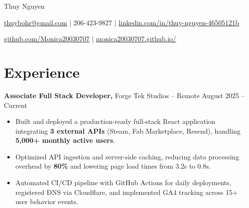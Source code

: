 \documentclass[11pt]{article}       %
\begin{document}
\centerline{\Huge Thuy Nguyen}

\vspace{5pt}

\centerline{\href{mailto:thuybohr@gmail.com}{thuybohr@gmail.com} | 206-423-9827 |
\href{https://www.linkedin.com/in/thuy-nguyen-46505121b/}{linkedin.com/in/thuy-nguyen-46505121b}}

\centerline{\href{https://github.com/Monica20030707}{github.com/Monica20030707} | 
\href{https://monica20030707.github.io/}{monica20030707.github.io/}} 

\vspace{-9pt}

\section*{Experience}

\textbf{Associate Full Stack Developer,} {Forge Tek Studios} -- Remote \hfill August 2025 -- Current \\
\vspace{-9pt}
\begin{itemize}
  \item Built and deployed a production-ready full-stack React application integrating \textbf{3 external APIs} (Steam, Fab Marketplace, Resend), handling \textbf{5,000+ monthly active users}.
  \item Optimized API ingestion and server-side caching, reducing data processing overhead by \textbf{80\%} and lowering page load times from 3.2s to 0.8s.
  \item Automated CI/CD pipeline with GitHub Actions for daily deployments, registered DNS via Cloudflare, and implemented GA4 tracking across 15+ user behavior events.
\end{itemize}
\end{document}
